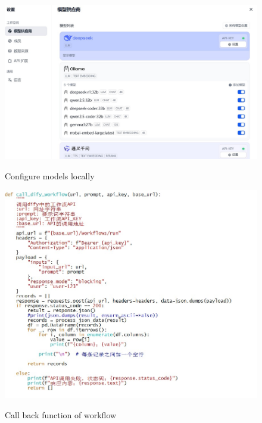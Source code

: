 \begin{figure}[H]
    \begin{center}
        \includegraphics[width=.95\linewidth]{res/dify-models.jpg}\\
        \caption{Configure  models locally }\label{dify-models}
    \end{center}
\end{figure}


\begin{figure}[H]
    \begin{center}
        \includegraphics[width=.95\linewidth]{res/dify-callworkflow.jpg}\\
        \caption{Call back function of workflow }\label{dify-callworkflow}
    \end{center}
\end{figure}


